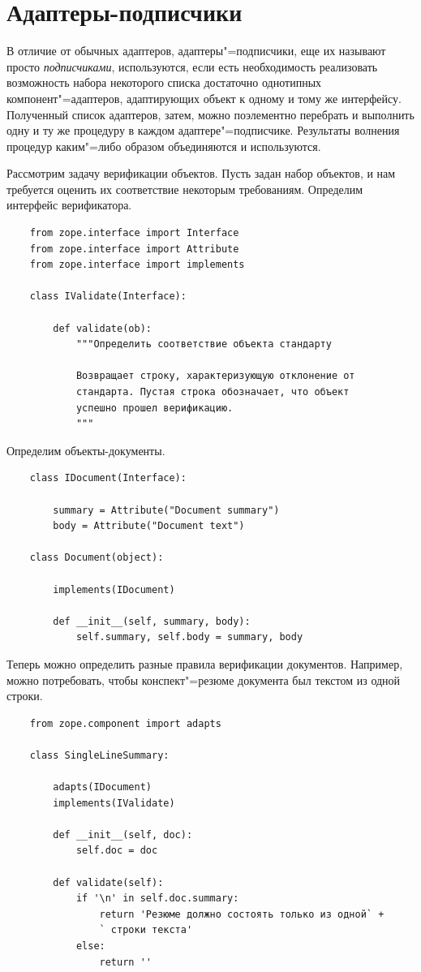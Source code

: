 \documentclass[a4paper,openany,twoside,final]{book}
\providecommand*{\DUroletitlereference}[1]{\textsl{#1}}
\begin{document}
\section{Адаптеры-подписчики%
  \label{id46}%
}

В отличие от обычных адаптеров, адаптеры"=подписчики, еще их называют просто \DUroletitlereference{подписчиками}, используются, если есть необходимость реализовать возможность набора некоторого списка достаточно однотипных компонент"=адаптеров, адаптирующих объект к одному и тому же интерфейсу.  Полученный список адаптеров, затем, можно поэлементно перебрать и выполнить одну и ту же процедуру в каждом адаптере"=подписчике.  Результаты волнения процедур каким"=либо образом объединяются и используются.

Рассмотрим задачу верификации объектов.  Пусть задан набор объектов, и нам требуется оценить их соответствие некоторым требованиям.  Определим интерфейс верификатора.

\begin{verbatim}
    from zope.interface import Interface
    from zope.interface import Attribute
    from zope.interface import implements

    class IValidate(Interface):

        def validate(ob):
            """Определить соответствие объекта стандарту

            Возвращает строку, характеризующую отклонение от
            стандарта. Пустая строка обозначает, что объект
            успешно прошел верификацию.
            """
\end{verbatim}

Определим объекты-документы.

\begin{verbatim}
    class IDocument(Interface):

        summary = Attribute("Document summary")
        body = Attribute("Document text")

    class Document(object):

        implements(IDocument)

        def __init__(self, summary, body):
            self.summary, self.body = summary, body
\end{verbatim}

Теперь можно определить разные правила верификации документов.  Например, можно потребовать, чтобы конспект"=резюме документа был текстом из одной строки.

\begin{verbatim}
    from zope.component import adapts

    class SingleLineSummary:

        adapts(IDocument)
        implements(IValidate)

        def __init__(self, doc):
            self.doc = doc

        def validate(self):
            if '\n' in self.doc.summary:
                return 'Резюме должно состоять только из одной` +
                ` строки текста'
            else:
                return ''
\end{verbatim}
\end{document}

